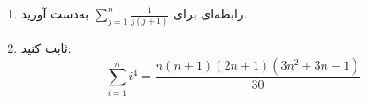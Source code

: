 \EXERCISE
\begin{enumerate}
\item
رابطه‌ای برای
$\sum_{j=1}^{n} \frac{1}{j(j + 1)}$
به‌دست آورید.
\item
ثابت کنید:
$$\sum_{i=1}^{n} i^4 = \frac{n(n + 1)(2n + 1)(3n^2 + 3n - 1)}{30}$$
\end{enumerate}